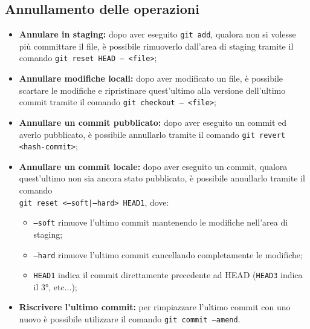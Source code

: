 \documentclass[12pt]{article}
\begin{document}
    \subsection{Annullamento delle operazioni}
    \begin{itemize}
      \item \textbf{Annulare in staging:} dopo aver eseguito \texttt{git add}, qualora non si volesse più committare il file, è possibile rimuoverlo dall'area di staging tramite il comando \texttt{git reset HEAD -- <file>};
      \item \textbf{Annullare modifiche locali:} dopo aver modificato un file, è possibile scartare le modifiche e ripristinare quest'ultimo alla versione dell'ultimo commit tramite il comando \texttt{git checkout -- <file>};
      \item \textbf{Annullare un commit pubblicato:} dopo aver eseguito un commit ed averlo pubblicato, è possibile annullarlo tramite il comando \texttt{git revert <hash-commit>};
      \item \textbf{Annullare un commit locale:} dopo aver eseguito un commit, qualora quest'ultimo non sia ancora stato pubblicato, è possibile annullarlo tramite il comando\\\texttt{git reset <--soft|--hard> HEAD\raisebox{-0.5ex}{\~{}}1}, dove:
        \begin{itemize}
          \item \texttt{--soft} rimuove l'ultimo commit mantenendo le modifiche nell'area di staging;
          \item \texttt{--hard} rimuove l'ultimo commit cancellando completamente le modifiche;
          \item \texttt{HEAD\raisebox{-0.5ex}{\~{}}1} indica il commit direttamente precedente ad HEAD (\texttt{HEAD\raisebox{-0.5ex}{\~{}}3} indica il 3°, etc...); 
        \end{itemize}
      \item \textbf{Riscrivere l'ultimo commit:} per rimpiazzare l'ultimo commit con uno nuovo è possibile utilizzare il comando \texttt{git commit --amend}.
    \end{itemize}
\end{document}

